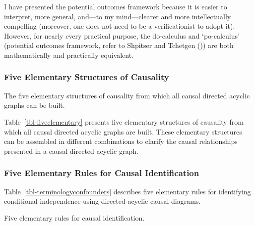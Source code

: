 \documentclass[
  single column]{article}
\begin{document}
I have presented the potential outcomes framework because it is easier
to interpret, more general, and---to my mind---clearer and more
intellectually compelling (moreover, one does not need to be a
verificationist to adopt it). However, for nearly every practical
purpose, the do-calculus and `po-calculus' (potential outcomes
framework, refer to Shpitser and Tchetgen
()) are both mathematically and
practically equivalent.

\subsubsection{Five Elementary Structures of
Causality}\label{five-elementary-structures-of-causality}

\begin{table}

\caption{\label{tbl-fiveelementary}The five elementary structures of
causality from which all causal directed acyclic graphs can be built.}

\centering{

\terminologydirectedgraph

}

\end{table}%

Table~\ref{tbl-fiveelementary} presents five elementary structures of
causality from which all causal directed acyclic graphs are built. These
elementary structures can be assembled in different combinations to
clarify the causal relationships presented in a causal directed acyclic
graph.

\newpage{}

\subsubsection{Five Elementary Rules for Causal
Identification}\label{five-elementary-rules-for-causal-identification}

Table~\ref{tbl-terminologyconfounders} describes five elementary rules
for identifying conditional independence using directed acyclic causal
diagrams.

\begin{table}

\caption{\label{tbl-terminologyconfounders}Five elementary rules for
causal identification.}

\centering{

\terminologyelconfounders

}

\end{table}%
\end{document}
